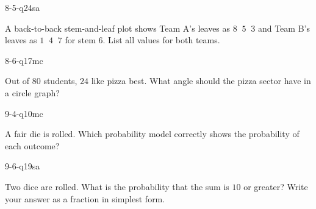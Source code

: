 \begin{practiceQuestion}{8-5-q24}{sa}
\begin{questionText}
A back-to-back stem-and-leaf plot shows Team A's leaves as $8\;\;5\;\;3$ and Team B's leaves as $1\;\;4\;\;7$ for stem $6$. List all values for both teams.
\end{questionText}
\end{practiceQuestion}

\begin{practiceQuestion}{8-6-q17}{mc}
\begin{questionText}
Out of $80$ students, $24$ like pizza best. What angle should the pizza sector have in a circle graph?
\end{questionText}
\end{practiceQuestion}

\begin{practiceQuestion}{9-4-q10}{mc}
\begin{questionText}
A fair die is rolled. Which probability model correctly shows the probability of each outcome?
\end{questionText}
\end{practiceQuestion}

\begin{practiceQuestion}{9-6-q19}{sa}
\begin{questionText}
Two dice are rolled. What is the probability that the sum is $10$ or greater? Write your answer as a fraction in simplest form.
\end{questionText}
\end{practiceQuestion}

